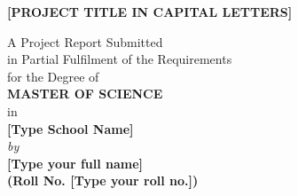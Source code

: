 \begin{titlepage}
\enlargethispage{3cm}

\begin{center}

\vspace*{-1cm}

\textbf{\Large [PROJECT TITLE IN CAPITAL LETTERS]}\\[10pt]

\vspace*{0.5cm}


A Project Report Submitted \\
in Partial Fulfilment of the Requirements  \\
for the Degree of  \\
\vspace{5mm}
{\Large \bf MASTER OF SCIENCE } \\
in \\
{\large \bf [Type School Name] } \\




                      \vspace{10mm}
                   {\em  by} \\ \vspace{3mm}
             {\large \bf [Type your full name]} \\
{\large \bf (Roll No. [Type your roll no.])}\\[.3in]


\end{center}
\end{titlepage}
